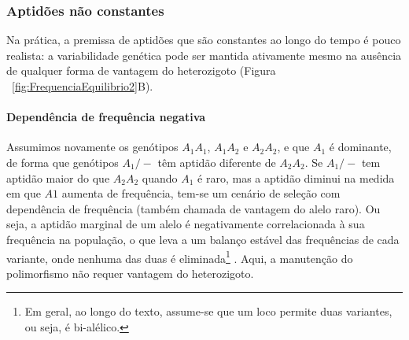 \begin{refsection}
%
\subsubsection{Aptidões não constantes} %

Na prática, a premissa de aptidões que são constantes ao longo do tempo é pouco realista: a variabilidade genética pode ser mantida ativamente mesmo na ausência de qualquer forma de vantagem do heterozigoto (Figura ~\ref{fig:FrequenciaEquilibrio2}B).

\paragraph{Dependência de frequência negativa} 

Assumimos novamente os genótipos $A_{1}A_{1}$, $A_{1}A_{2}$ e $A_{2}A_{2}$, e que $A_{1}$ é dominante, de forma que genótipos $A_{1}/-$ têm aptidão diferente de $A_{2}A_{2}$.  Se  $A_{1}/-$ tem aptidão maior do que $A_{2}A_{2}$ quando $A_{1}$ é raro, mas a aptidão diminui na medida em que $A1$ aumenta de frequência, tem-se um cenário de seleção com dependência de frequência (também chamada de vantagem do alelo raro). Ou seja, a aptidão marginal de um alelo é negativamente correlacionada à sua frequência na população, o que leva a um balanço estável das frequências de cada variante, onde nenhuma das duas é eliminada\footnote{Em geral, ao longo do texto, assume-se que um loco permite duas variantes, ou seja, é bi-alélico.} \parencite{Clarke1962,Charlesworth2010}. Aqui,  a manutenção do polimorfismo não requer vantagem do heterozigoto.


\end{refsection}
